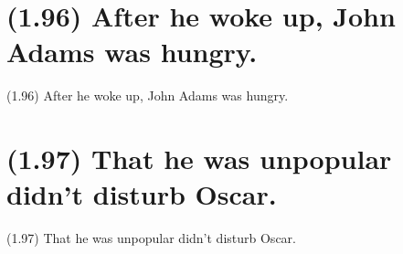 \documentclass{article}
\begin{document}
\section*{(1.96) After he woke up, John Adams was hungry.}

\bigbreak
\begin{enumerate*}
\item[(1.96)] After he woke up, John Adams was hungry.
\end{enumerate*}
\bigbreak

\bigbreak
\begin{minipage}{\textwidth}
\end{minipage}
\bigbreak

\bigbreak
\begin{minipage}{\textwidth}
\end{minipage}
\bigbreak

\clearpage

%
%

\section*{(1.97) That he was unpopular didn't disturb Oscar.}

\bigbreak
\begin{enumerate*}
\item[(1.97)] That he was unpopular didn't disturb Oscar.
\end{enumerate*}
\bigbreak
\end{document}
